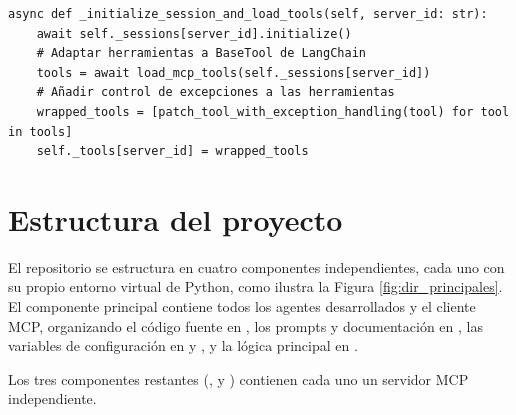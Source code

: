 \begin{lstlisting}[caption={\protect\opus{mcp_multi_client.py}: función \protect\opus{_initialize_session_and_load_tools} en el cliente MCP},label={lst:mcpinit}]
  async def _initialize_session_and_load_tools(self, server_id: str):
    await self._sessions[server_id].initialize()
    # Adaptar herramientas a BaseTool de LangChain
    tools = await load_mcp_tools(self._sessions[server_id])
    # Añadir control de excepciones a las herramientas
    wrapped_tools = [patch_tool_with_exception_handling(tool) for tool in tools]
    self._tools[server_id] = wrapped_tools
\end{lstlisting}

\section{Estructura del proyecto}
El repositorio se estructura en cuatro componentes independientes, cada uno con su propio entorno virtual de Python, como ilustra la Figura \ref{fig:dir_principales}. El componente principal  contiene todos los agentes desarrollados y el cliente MCP, organizando el código fuente en , los prompts y documentación en , las variables de configuración en  y , y la lógica principal en .

Los tres componentes restantes (,  y ) contienen cada uno un servidor MCP independiente.

